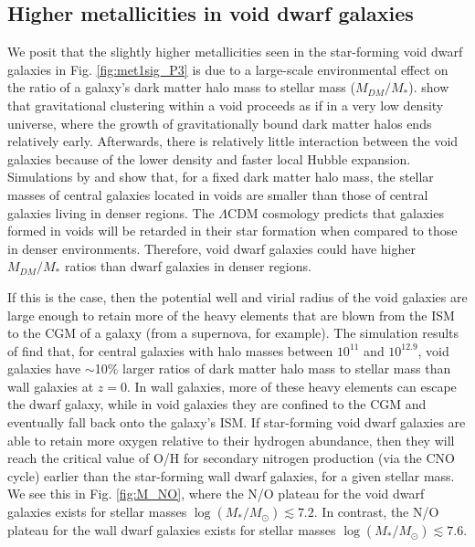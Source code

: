 \subsection{Higher metallicities in void dwarf galaxies}

We posit that the slightly higher metallicities seen in the star-forming void 
dwarf galaxies in Fig. \ref{fig:met1sig_P3} is due to a large-scale 
environmental effect on the ratio of a galaxy's dark matter halo mass to stellar 
mass ($M_{DM}/M_*$).  \cite{Goldberg04} show that gravitational clustering 
within a void proceeds as if in a very low density universe, where the growth of 
gravitationally bound dark matter halos ends relatively early.  Afterwards, 
there is relatively little interaction between the void galaxies because of the 
lower density and faster local Hubble expansion.  Simulations by \cite{Jung14} 
and \cite{Tonnesen15} show that, for a fixed dark matter halo mass, the stellar 
masses of central galaxies located in voids are smaller than those of central 
galaxies living in denser regions.  The $\Lambda$CDM cosmology predicts that 
galaxies formed in voids will be retarded in their star formation when compared 
to those in denser environments.  Therefore, void dwarf galaxies could have 
higher $M_{DM}/M_*$ ratios than dwarf galaxies in denser regions.

If this is the case, then the potential well and virial radius of the void 
galaxies are large enough to retain more of the heavy elements that are blown 
from the ISM to the CGM of a galaxy (from a supernova, for example).  The 
simulation results of \cite{Tonnesen15} find that, for central galaxies with 
halo masses between $10^{11}$ and $10^{12.9}$, void galaxies have $\sim$10\% 
larger ratios of dark matter halo mass to stellar mass than wall galaxies at 
$z = 0$.  In wall galaxies, more of these heavy elements can escape the dwarf 
galaxy, while in void galaxies they are confined to the CGM and eventually fall 
back onto the galaxy's ISM.  If star-forming void dwarf galaxies are able to 
retain more oxygen relative to their hydrogen abundance, then they will reach 
the critical value of O/H for secondary nitrogen production (via the CNO cycle) 
earlier than the star-forming wall dwarf galaxies, for a given stellar mass.  We 
see this in Fig. \ref{fig:M_NO}, where the N/O plateau for the void dwarf 
galaxies exists for stellar masses $\log(M_*/M_\odot) \lesssim 7.2$.  In 
contrast, the N/O plateau for the wall dwarf galaxies exists for stellar masses 
$\log(M_*/M_\odot) \lesssim 7.6$.

